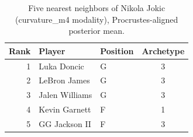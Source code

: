 \begin{table}[htbp]
  \centering\small
  \begin{tabular}{rllc}
    \toprule
    Rank & Player & Position & Archetype \\
    \midrule
    1 & Luka Doncic & G & 3 \\
    2 & LeBron James & G & 3 \\
    3 & Jalen Williams & G & 3 \\
    4 & Kevin Garnett & F & 1 \\
    5 & GG Jackson II & F & 3 \\
    \bottomrule
  \end{tabular}
  \caption{Five nearest neighbors of Nikola Jokic (curvature_m4 modality), Procrustes-aligned posterior mean.}
  \label{tab:Nikola_Jokic_neighbors_curvature_m4}
\end{table}

